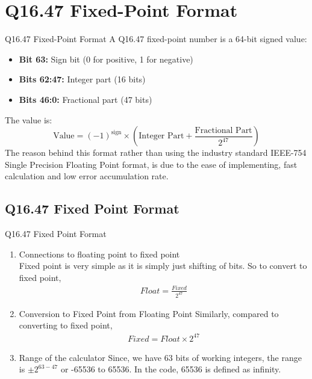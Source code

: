 \documentclass{beamer}
\theoremstyle{remark}
\begin{document}
\section{Q16.47 Fixed-Point Format}
\begin{frame}{Q16.47 Fixed-Point Format}
    A Q16.47 fixed-point number is a 64-bit signed value:
\begin{itemize}
    \item \textbf{Bit 63:} Sign bit (0 for positive, 1 for negative)
    \item \textbf{Bits 62:47:} Integer part (16 bits)
    \item \textbf{Bits 46:0:} Fractional part (47 bits)
\end{itemize}
The value is:
\begin{equation}
    \text{Value} = (-1)^{\text{sign}} \times \left(\text{Integer Part} + \frac{\text{Fractional Part}}{2^{47}}\right)
\end{equation}
The reason behind this format rather than using the industry standard IEEE-754 Single Precision Floating Point format, is due to the ease of implementing, fast calculation and low error accumulation rate. 
\end{frame}

\subsection{Q16.47 Fixed Point Format}
\begin{frame}{Q16.47 Fixed Point Format}
    \begin{enumerate}
        \item Connections to floating point to fixed point\\
        Fixed point is very simple as it is simply just shifting of bits. So to convert to fixed point,
    \begin{align}
        Float = \frac{Fixed}{2^{47}}
    \end{align}
    \item Conversion to Fixed Point from Floating Point
    Similarly, compared to converting to fixed point,
\begin{align}
    Fixed = {Float}\times{2^{47}}
\end{align}
\item Range of the calculator
Since, we have 63 bits of working integers, the range is $\pm 2^{63-47}$ or -65536 to 65536. In the code, 65536 is defined as infinity.
    \end{enumerate}
\end{frame}
\end{document}
